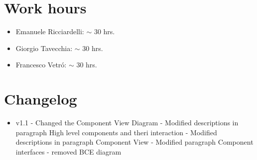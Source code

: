 \documentclass[10pt, a4paper,titlepage]{article}
\begin{document}
\section*{Work hours} 
\begin{itemize}
\item Emanuele Ricciardelli: $\sim$ 30 hrs.
\item Giorgio Tavecchia: $\sim$ 30 hrs.
\item Francesco Vetr\'o: $\sim$ 30 hrs.
\end{itemize}
\section*{Changelog}
\begin{itemize}
\item v1.1
\subitem - Changed the Component View Diagram
\subitem - Modified descriptions in paragraph High level components and theri interaction
\subitem - Modified descriptions in paragraph Component View
\subitem - Modified paragraph Component interfaces
\subitem - removed BCE diagram
\end{itemize}
\enddocument
\end{document}
